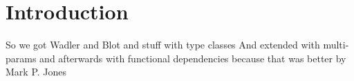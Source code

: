 \section{Introduction}
So we got Wadler and Blot and stuff with type classes \cite{Wadler:1989:MAP:75277.75283}
And extended with multi-params and afterwards with functional dependencies
because that was better by Mark P. Jones \cite{Jones00typeclasses}

